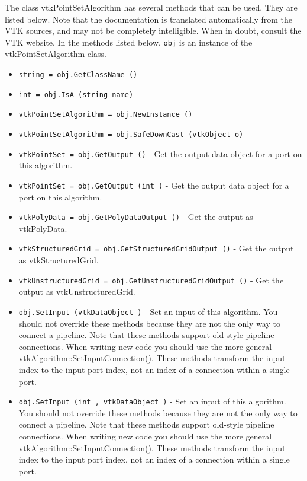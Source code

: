 The class vtkPointSetAlgorithm has several methods that can be used.
  They are listed below.
Note that the documentation is translated automatically from the VTK sources,
and may not be completely intelligible.  When in doubt, consult the VTK website.
In the methods listed below, \verb|obj| is an instance of the vtkPointSetAlgorithm class.
\begin{itemize}
\item  \verb|string = obj.GetClassName ()|

\item  \verb|int = obj.IsA (string name)|

\item  \verb|vtkPointSetAlgorithm = obj.NewInstance ()|

\item  \verb|vtkPointSetAlgorithm = obj.SafeDownCast (vtkObject o)|

\item  \verb|vtkPointSet = obj.GetOutput ()| -  Get the output data object for a port on this algorithm.

\item  \verb|vtkPointSet = obj.GetOutput (int )| -  Get the output data object for a port on this algorithm.

\item  \verb|vtkPolyData = obj.GetPolyDataOutput ()| -  Get the output as vtkPolyData.

\item  \verb|vtkStructuredGrid = obj.GetStructuredGridOutput ()| -  Get the output as vtkStructuredGrid.

\item  \verb|vtkUnstructuredGrid = obj.GetUnstructuredGridOutput ()| -  Get the output as vtkUnstructuredGrid.

\item  \verb|obj.SetInput (vtkDataObject )| -  Set an input of this algorithm. You should not override these
 methods because they are not the only way to connect a pipeline.
 Note that these methods support old-style pipeline connections.
 When writing new code you should use the more general
 vtkAlgorithm::SetInputConnection().  These methods transform the
 input index to the input port index, not an index of a connection
 within a single port.

\item  \verb|obj.SetInput (int , vtkDataObject )| -  Set an input of this algorithm. You should not override these
 methods because they are not the only way to connect a pipeline.
 Note that these methods support old-style pipeline connections.
 When writing new code you should use the more general
 vtkAlgorithm::SetInputConnection().  These methods transform the
 input index to the input port index, not an index of a connection
 within a single port.


\end{itemize}
